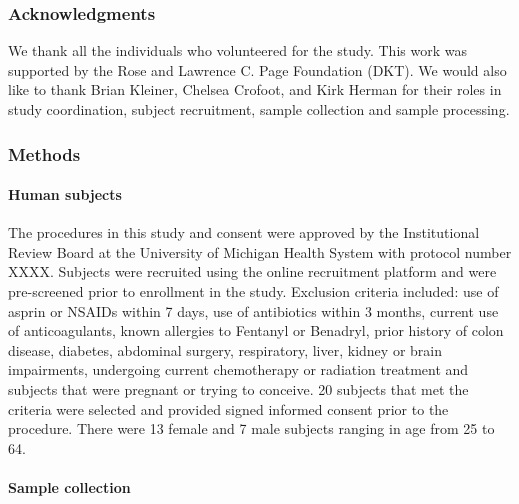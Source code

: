 \documentclass[11pt,]{article}
\let\oldparagraph\paragraph
\renewcommand{\paragraph}[1]{\oldparagraph{#1}\mbox{}}
\begin{document}
\subsubsection{Acknowledgments}\label{acknowledgments}

We thank all the individuals who volunteered for the study. This work
was supported by the Rose and Lawrence C. Page Foundation (DKT). We
would also like to thank Brian Kleiner, Chelsea Crofoot, and Kirk Herman
for their roles in study coordination, subject recruitment, sample
collection and sample processing.

\subsubsection{Methods}\label{methods}

\paragraph{Human subjects}\label{human-subjects}

The procedures in this study and consent were approved by the
Institutional Review Board at the University of Michigan Health System
with protocol number XXXX. Subjects were recruited using the online
recruitment platform and were pre-screened prior to enrollment in the
study. Exclusion criteria included: use of asprin or NSAIDs within 7
days, use of antibiotics within 3 months, current use of anticoagulants,
known allergies to Fentanyl or Benadryl, prior history of colon disease,
diabetes, abdominal surgery, respiratory, liver, kidney or brain
impairments, undergoing current chemotherapy or radiation treatment and
subjects that were pregnant or trying to conceive. 20 subjects that met
the criteria were selected and provided signed informed consent prior to
the procedure. There were 13 female and 7 male subjects ranging in age
from 25 to 64.

\paragraph{Sample collection}\label{sample-collection}
\end{document}
